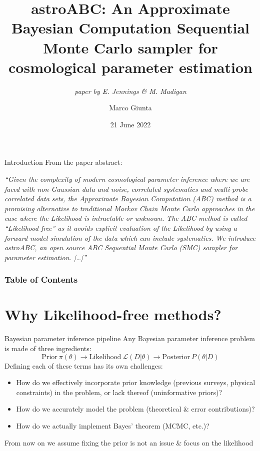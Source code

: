 \documentclass{beamer}
\title[astroABC]{astroABC: An Approximate Bayesian Computation
Sequential Monte Carlo sampler for cosmological
parameter estimation}
\subtitle{\textit{paper by E. Jennings \& M. Madigan}}
\author{Marco Giunta}
\date[21/06/22]{21 June 2022}
\theoremstyle{remark}
\renewcommand{\L}{\mathcal{L}}
\begin{document}
\frame{\titlepage}


\begin{frame}{Introduction}
From the paper abstract: 

\textit{
``Given the complexity of modern cosmological parameter inference where
we are faced with non-Gaussian data and noise, correlated systematics and
multi-probe correlated data sets, the Approximate Bayesian Computation
(ABC) method is a promising alternative to traditional Markov Chain Monte
Carlo approaches in the case where the Likelihood is intractable or unknown.
The ABC method is called “Likelihood free” as it avoids explicit evaluation
of the Likelihood by using a forward model simulation of the data which can
include systematics. We introduce astroABC, an open source ABC Sequential Monte Carlo (SMC) sampler for parameter estimation. [\dots]''}
\end{frame}



\begin{frame}
\frametitle{Table of Contents}
\tableofcontents
\end{frame}



\section{Why Likelihood-free methods?}
\begin{frame}{Bayesian parameter inference pipeline}
Any Bayesian parameter inference problem is made of three ingredients:
\begin{equation*}
    \text{Prior} \ \pi(\theta) \to \text{Likelihood} \ \L(D|\theta) \to \text{Posterior} \ P(\theta|D)
\end{equation*}
Defining each of these terms has its own challenges:\pause
\begin{itemize}[<+->]
    \item How do we effectively incorporate prior knowledge (previous surveys, physical constraints) in the problem, or lack thereof (uninformative priors)?
    \item How do we accurately model the problem (theoretical \& error contributions)?
    \item How do we actually implement Bayes' theorem (MCMC, etc.)?
\end{itemize}
\pause[\thebeamerpauses]
From now on we assume fixing the prior is not an issue \& focus on the likelihood
\end{frame}
\end{document}
